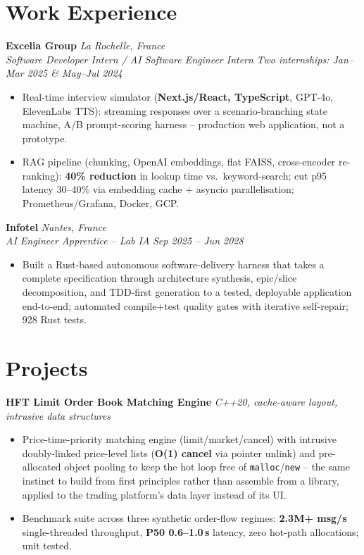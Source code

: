 \documentclass[10pt]{article}
\newcommand{\entry}[4]{%
  \noindent\textbf{#1} \hfill \textit{#2} \\
  \textit{#3} \hfill \textit{#4}\\[-0.3em]
}
\newcommand{\projectentry}[2]{%
  \noindent\textbf{#1} \hfill \textit{#2}\\[-0.3em]
}
\begin{document}
\section*{Work Experience}
\entry{Excelia Group}{La Rochelle, France}{Software Developer Intern / AI Software Engineer Intern}{Two internships: Jan--Mar 2025 \& May--Jul 2024}
\begin{itemize}
  \item Real-time interview simulator (\textbf{Next.js/React, TypeScript}, GPT-4o, ElevenLabs TTS): streaming responses over a scenario-branching state machine, A/B prompt-scoring harness -- production web application, not a prototype.
  \item RAG pipeline (chunking, OpenAI embeddings, flat FAISS, cross-encoder re-ranking): \textbf{40\% reduction} in lookup time vs.\ keyword-search; cut p95 latency 30--40\% via embedding cache + asyncio parallelisation; Prometheus/Grafana, Docker, GCP.
\end{itemize}
\entry{Infotel}{Nantes, France}{AI Engineer Apprentice -- Lab IA}{Sep 2025 -- Jun 2028}
\begin{itemize}
  \item Built a Rust-based autonomous software-delivery harness that takes a complete specification through architecture synthesis, epic/slice decomposition, and TDD-first generation to a tested, deployable application end-to-end; automated compile+test quality gates with iterative self-repair; 928 Rust tests.
\end{itemize}

\section*{Projects}

\projectentry{HFT Limit Order Book Matching Engine}{C++20, cache-aware layout, intrusive data structures}
\begin{itemize}
  \item Price-time-priority matching engine (limit/market/cancel) with intrusive doubly-linked price-level lists (\textbf{O(1) cancel} via pointer unlink) and pre-allocated object pooling to keep the hot loop free of \texttt{malloc}/\texttt{new} -- the same instinct to build from first principles rather than assemble from a library, applied to the trading platform's data layer instead of its UI.
  \item Benchmark suite across three synthetic order-flow regimes: \textbf{2.3M+ msg/s} single-threaded throughput, \textbf{P50 0.6--1.0\,\textmu s} latency, zero hot-path allocations; unit tested.
\end{itemize}
\end{document}

